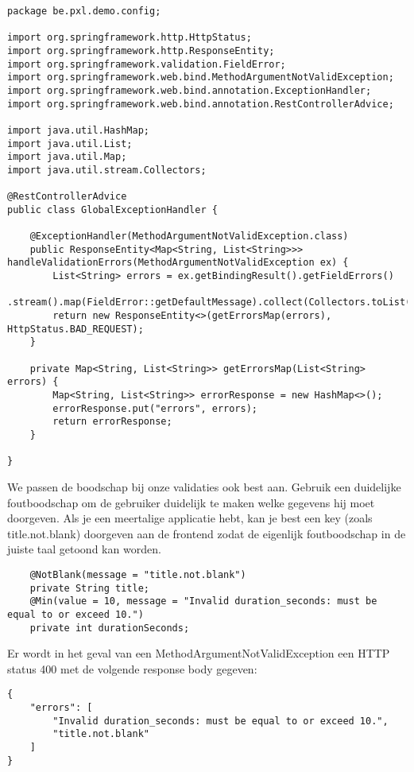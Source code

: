 \begin{lstlisting}
package be.pxl.demo.config;

import org.springframework.http.HttpStatus;
import org.springframework.http.ResponseEntity;
import org.springframework.validation.FieldError;
import org.springframework.web.bind.MethodArgumentNotValidException;
import org.springframework.web.bind.annotation.ExceptionHandler;
import org.springframework.web.bind.annotation.RestControllerAdvice;

import java.util.HashMap;
import java.util.List;
import java.util.Map;
import java.util.stream.Collectors;

@RestControllerAdvice
public class GlobalExceptionHandler {

	@ExceptionHandler(MethodArgumentNotValidException.class)
	public ResponseEntity<Map<String, List<String>>> handleValidationErrors(MethodArgumentNotValidException ex) {
		List<String> errors = ex.getBindingResult().getFieldErrors()
				.stream().map(FieldError::getDefaultMessage).collect(Collectors.toList());
		return new ResponseEntity<>(getErrorsMap(errors), HttpStatus.BAD_REQUEST);
	}

	private Map<String, List<String>> getErrorsMap(List<String> errors) {
		Map<String, List<String>> errorResponse = new HashMap<>();
		errorResponse.put("errors", errors);
		return errorResponse;
	}

}

\end{lstlisting}

We passen de boodschap bij onze validaties ook best aan.  Gebruik een duidelijke foutboodschap om de gebruiker duidelijk te maken welke gegevens hij moet doorgeven.
Als je een meertalige applicatie hebt, kan je best een key (zoals title.not.blank) doorgeven aan de frontend zodat de eigenlijk foutboodschap in de juiste taal getoond kan worden.


\begin{lstlisting}
	@NotBlank(message = "title.not.blank")
	private String title;
	@Min(value = 10, message = "Invalid duration_seconds: must be equal to or exceed 10.")
	private int durationSeconds;
\end{lstlisting}

Er wordt in het geval van een MethodArgumentNotValidException een HTTP status 400 met de volgende response body gegeven:
\begin{verbatim}
{
	"errors": [
		"Invalid duration_seconds: must be equal to or exceed 10.",
		"title.not.blank"
	]
}
\end{verbatim}


